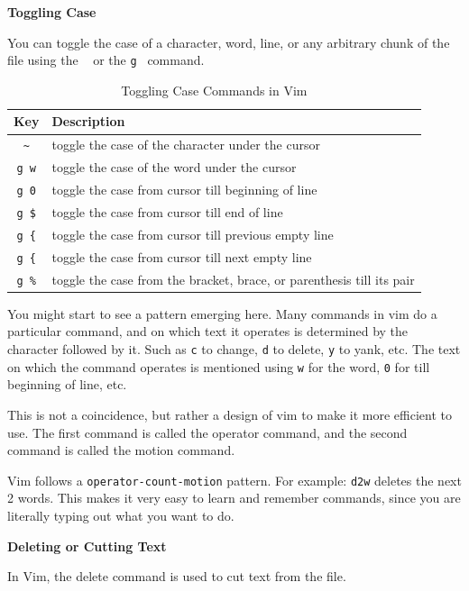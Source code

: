 \textbf{Toggling Case}

You can toggle the case of a character, word, line,
or any arbitrary chunk of the file using the \texttt{~}
or the \texttt{g~} command.

\begin{table}[h!]
  \caption{Toggling Case Commands in Vim}
  \begin{tabular}{c l}
    \toprule
    Key & Description \\
    \midrule
    \texttt{\textasciitilde} & toggle the case of the character under the cursor \\
    \texttt{g~w} & toggle the case of the word under the cursor \\
    \texttt{g~0} & toggle the case from cursor till beginning of line \\
    \texttt{g~\$} & toggle the case from cursor till end of line \\
    \texttt{g~\{} & toggle the case from cursor till previous empty line \\
    \texttt{g~\{} & toggle the case from cursor till next empty line \\
    \texttt{g~\%} & toggle the case from the bracket, brace, or parenthesis till its pair \\
    \bottomrule
  \end{tabular}
\end{table}

You might start to see a pattern emerging here.
Many commands in vim do a particular command,
and on which text it operates is determined by
the character followed by it. Such as \texttt{c}
to change, \texttt{d} to delete, \texttt{y} to yank,
etc. The text on which the command operates is
mentioned using \texttt{w} for the word, \texttt{0}
for till beginning of line, etc.

This is not a coincidence, but rather a design
of vim to make it more efficient to use.
The first command is called the operator command,
and the second command is called the motion command.

Vim follows a \texttt{operator-count-motion} pattern.
For example: \texttt{d2w} deletes the next 2 words.
This makes it very easy to learn and remember commands,
since you are literally typing out what you want to do.

\textbf{Deleting or Cutting Text}

In Vim, the delete command is used to cut text from the file.

